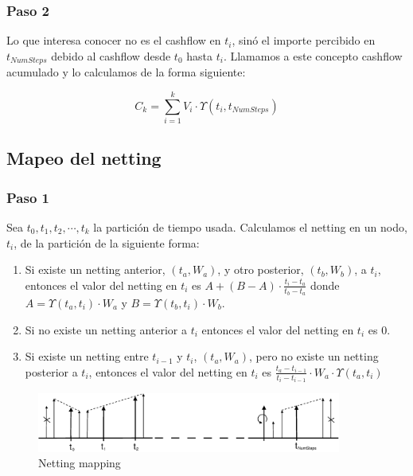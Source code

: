 \subsubsection{Paso 2}

Lo que interesa conocer no es el cashflow en $t_i$, sin\'o el importe
percibido en $t_{NumSteps}$ debido al cashflow desde $t_0$ hasta $t_i$.
Llamamos a este concepto cashflow acumulado y lo calculamos de la
forma siguiente:

\begin{displaymath}
C_k = \sum_{i=1}^{k} V_i \cdot \Upsilon(t_i,t_{NumSteps})
\end{displaymath}



\subsection{Mapeo del netting}

\subsubsection{Paso 1}

Sea $t_0, t_1, t_2, \cdots, t_k$ la partici\'on de tiempo usada.
Calculamos el netting en un nodo, $t_i$, de la partici\'on de la
siguiente forma:

\begin{enumerate}
\item Si existe un netting anterior, $(t_a,W_a)$, y otro posterior, $(t_b,W_b)$,
a $t_i$, entonces el valor del netting en $t_i$ es
$A + (B-A) \cdot \frac{t_i-t_a}{t_b-t_a}$ donde
$A=\Upsilon(t_a,t_i) \cdot W_a$ y $B=\Upsilon(t_b,t_i) \cdot W_b$.
\item Si no existe un netting anterior a $t_i$ entonces el valor del netting
en $t_i$ es $0$.
\item Si existe un netting entre $t_{i-1}$ y $t_i$, $(t_a,W_a)$, pero no existe un
netting posterior a $t_i$, entonces el valor del netting en $t_i$ es
$\frac{t_a-t_{i-1}}{t_i-t_{i-1}} \cdot W_a \cdot \Upsilon(t_a,t_i)$
\end{enumerate}

\begin{figure}[!hb]
\begin{center}
\includegraphics[width=10cm,angle=0]{./images/nettingmapping.eps}
\caption{Netting mapping}
\label{timetranches}
\end{center}
\end{figure}

